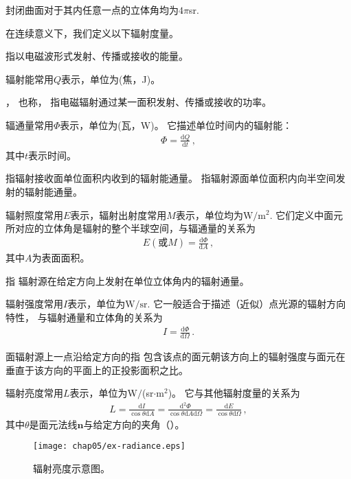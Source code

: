 \begin{corollary}
      封闭曲面对于其内任意一点的立体角均为$4\pi$sr.
\end{corollary}

在连续意义下，我们定义以下辐射度量。

\begin{definition}
      指以电磁波形式发射、传播或接收的能量。
\end{definition}
辐射能常用$Q$表示，单位为(焦，J)。

\begin{definition}
      ，
      也称，
      指电磁辐射通过某一面积发射、传播或接收的功率。
\end{definition}
辐通量常用$\varPhi$表示，单位为(瓦，W)。
它描述单位时间内的辐射能：
\begin{align}
      \varPhi=\frac{\mathrm{d}Q}{\mathrm{d}t}\, ,
\end{align}
其中$t$表示时间。

\begin{definition}
      指辐射接收面单位面积内收到的辐射能通量。
      指辐射源面单位面积内向半空间发射的辐射能通量。
\end{definition}
辐射照度常用$E$表示，辐射出射度常用$M$表示，单位均为$\text{W}/\text{m}^2$.
它们定义中面元所对应的立体角是辐射的整个半球空间，与辐通量的关系为
\begin{align}
      E(\text{或}M)=\frac{\mathrm{d}\varPhi}{\mathrm{d}A}\, ,
\end{align}
其中$A$为表面面积。

\begin{definition}
      指
      辐射源在给定方向上发射在单位立体角内的辐射通量。
\end{definition}
辐射强度常用$I$表示，单位为$\text{W}/\text{sr}$.
它一般适合于描述（近似）点光源的辐射方向特性，
与辐射通量和立体角的关系为
\begin{align}
      I=\frac{\mathrm{d}\varPhi}{\mathrm{d}\varOmega}\, .
\end{align}

\begin{definition}
      面辐射源上一点沿给定方向的指
      包含该点的面元朝该方向上的辐射强度与面元在垂直于该方向的平面上的正投影面积之比。
\end{definition}
辐射亮度常用$L$表示，单位为W$/$(sr$\cdot$m$^2$)。
它与其他辐射度量的关系为
\begin{align}\label{eq:5.ex-radiance}
      L=\frac{\mathrm{d}I}{\cos\theta\mathrm{d}A}=\frac{\mathrm{d}^2\varPhi}{\cos\theta\mathrm{d}A\mathrm{d}\varOmega}=\frac{\mathrm{d}E}{\cos\theta\mathrm{d}\varOmega}\, ,
\end{align}
其中$\theta$是面元法线$\bm n$与给定方向的夹角（）。
\begin{figure}[htbp]
      \centering\texttt{[image: chap05/ex-radiance.eps]}
      \caption{辐射亮度示意图。}
      \label{fig:5.ex01-add01}
\end{figure}

